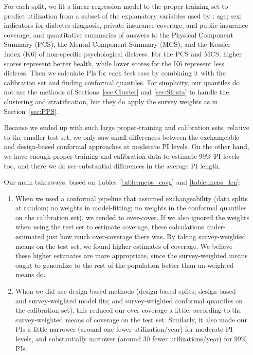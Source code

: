 \documentclass[10.5pt, letterpaper]{article}
\numberwithin{table}{section}
\numberwithin{figure}{section}
\numberwithin{equation}{section}
\begin{document}
For each split, we fit a linear regression model to the proper-training set to predict utilization from a subset of the explanatory variables used by \cite{romano2019conformalized}: age; sex; indicators for diabetes diagnosis, private insurance coverage, and public insurance coverage; and quantitative summaries of answers to the Physical Component Summary (PCS), the Mental Component Summary (MCS), and the Kessler Index (K6) of non-specific psychological distress. For the PCS and MCS, higher scores represent better health, while lower scores for the K6 represent less distress. Then we calculate PIs for each test case by combining it with the calibration set and finding conformal quantiles. For simplicity, our quantiles do not use the methods of Sections~\ref{sec:Cluster} and \ref{sec:Strata} to handle the clustering and stratification, but they do apply the survey weights as in Section~\ref{sec:PPS}.



Because we ended up with such large proper-training and calibration sets, relative to the smaller test set, we only saw small differences between the exchangeable and design-based conformal approaches at moderate PI levels. On the other hand, we have enough proper-training and calibration data to estimate 99\% PI levels too, and there we do see substantial differences in the average PI length.

Our main takeaways, based on Tables~\ref{table:meps_covg} and \ref{table:meps_len}:

\begin{enumerate}
  \item When we used a conformal pipeline that assumed exchangeability (data splits at random; no weights in model-fitting; no weights in the conformal quantiles on the calibration set), we tended to over-cover. If we also ignored the weights when using the test set to estimate coverage, these calculations under-estimated just how much over-coverage there was. By taking survey-weighted means on the test set, we found higher estimates of coverage. We believe these higher estimates are more appropriate, since the survey-weighted means ought to generalize to the rest of the population better than un-weighted means do.
  \item When we did use design-based methods (design-based splits; design-based and survey-weighted model fits; and survey-weighted conformal quantiles on the calibration set), this reduced our over-coverage a little, according to the survey-weighted means of coverage on the test set. Similarly, it also made our PIs a little narrower (around one fewer utilization/year) for moderate PI levels, and substantially narrower (around 30 fewer utilizations/year) for 99\% PIs.
\end{enumerate}
\end{document}
